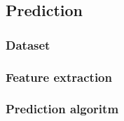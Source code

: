 \subsection{Prediction}

\subsubsection{Dataset}

\subsubsection{Feature extraction}

\subsubsection{Prediction algoritm}

